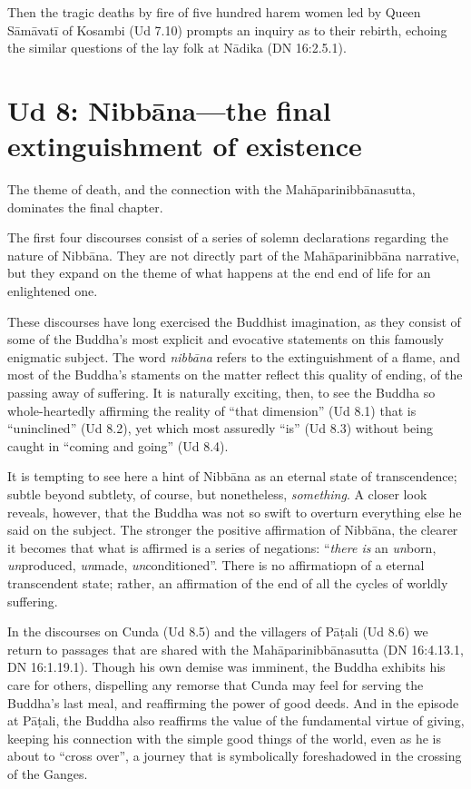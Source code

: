 \documentclass[12pt,openany]{book}%
\begin{document}
Then the tragic deaths by fire of five hundred harem women led by Queen \textsanskrit{Sāmāvatī} of Kosambi (Ud 7.10) prompts an inquiry as to their rebirth, echoing the similar questions of the lay folk at \textsanskrit{Nādika} (DN 16:2.5.1). 

\section*{Ud 8: \textsanskrit{Nibbāna}—the final extinguishment of existence}

The theme of death, and the connection with the \textsanskrit{Mahāparinibbānasutta}, dominates the final chapter. 

The first four discourses consist of a series of solemn declarations regarding the nature of \textsanskrit{Nibbāna}. They are not directly part of the \textsanskrit{Mahāparinibbāna} narrative, but they expand on the theme of what happens at the end end of life for an enlightened one. 

These discourses have long exercised the Buddhist imagination, as they consist of some of the Buddha’s most explicit and evocative statements on this famously enigmatic subject. The word \textit{\textsanskrit{nibbāna}} refers to the extinguishment of a flame, and most of the Buddha’s staments on the matter reflect this quality of ending, of the passing away of suffering. It is naturally exciting, then, to see the Buddha so whole-heartedly affirming the reality of “that dimension” (Ud 8.1) that is “uninclined” (Ud 8.2), yet which most assuredly “is” (Ud 8.3) without being caught in “coming and going” (Ud 8.4). 

It is tempting to see here a hint of \textsanskrit{Nibbāna} as an eternal state of transcendence; subtle beyond subtlety, of course, but nonetheless, \emph{something}. A closer look reveals, however, that the Buddha was not so swift to overturn everything else he said on the subject. The stronger the positive affirmation of \textsanskrit{Nibbāna}, the clearer it becomes that what is affirmed is a series of negations: “\emph{there is} an \emph{un}born, \emph{un}produced, \emph{un}made, \emph{un}conditioned”. There is no affirmatiopn of a eternal transcendent state; rather, an affirmation of the end of all the cycles of worldly suffering.

In the discourses on Cunda (Ud 8.5) and the villagers of \textsanskrit{Pāṭali} (Ud 8.6) we return to passages that are shared with the \textsanskrit{Mahāparinibbānasutta} (DN 16:4.13.1, DN 16:1.19.1). Though his own demise was imminent, the Buddha exhibits his care for others, dispelling any remorse that Cunda may feel for serving the Buddha’s last meal, and reaffirming the power of good deeds. And in the episode at \textsanskrit{Pāṭali}, the Buddha also reaffirms the value of the fundamental virtue of giving, keeping his connection with the simple good things of the world, even as he is about to “cross over”, a journey that is symbolically foreshadowed in the crossing of the Ganges. 
\end{document}
